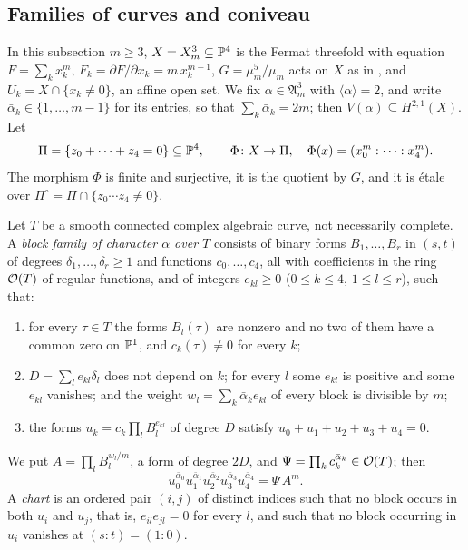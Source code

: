 \subsection{Families of curves and coniveau}\label{ssec:families}
In this subsection $m\ge3$, $X=X^{3}_{m}\subseteq\mathbb{P}^{4}$ is the Fermat
threefold with equation $F=\sum_{k}x_{k}^{m}$, $F_{k}=\partial F/\partial
x_{k}=m\,x_{k}^{m-1}$, $G=\mu_{m}^{5}/\mu_{m}$ acts on $X$ as in
, and $U_{k}=X\cap\{x_{k}\ne0\}$, an affine open set.
We fix $\alpha\in\mathfrak A^{3}_{m}$ with $\langle\alpha\rangle=2$, and
write $\bar\alpha_{k}\in\{1,\dots,m-1\}$ for its entries, so that
$\sum_{k}\bar\alpha_{k}=2m$; then $V(\alpha)\subseteq H^{2,1}(X)$. Let
\[
  \Pi=\{z_{0}+\dots+z_{4}=0\}\subseteq\mathbb{P}^{4},\qquad \Phi\colon X\to\Pi,\quad
  \Phi(x)=(x_{0}^{m}:\dots:x_{4}^{m}).
\]
The morphism $\Phi$ is finite and surjective, it is the quotient by $G$, and
it is \'etale over $\Pi^{\circ}=\Pi\cap\{z_{0}\cdots z_{4}\ne0\}$.

\begin{definition}\label{def:blockfamily}
Let $T$ be a smooth connected complex algebraic curve, not necessarily
complete. A \emph{block family of character $\alpha$ over $T$} consists of
binary forms $B_{1},\dots,B_{r}$ in $(s,t)$ of degrees $\delta_{1},\dots,
\delta_{r}\ge1$ and functions $c_{0},\dots,c_{4}$, all with coefficients in
the ring $\mathcal{O}(T)$ of regular functions, and of integers $e_{kl}\ge0$
($0\le k\le4$, $1\le l\le r$), such that:
\begin{enumerate}[label=\textup{(B\arabic*)}]
\item for every $\tau\in T$ the forms $B_{l}(\tau)$ are nonzero and no two
of them have a common zero on $\mathbb{P}^{1}$, and $c_{k}(\tau)\ne0$ for every
$k$;
\item $D=\sum_{l}e_{kl}\delta_{l}$ does not depend on $k$; for every $l$
some $e_{kl}$ is positive and some $e_{kl}$ vanishes; and the weight
$w_{l}=\sum_{k}\bar\alpha_{k}e_{kl}$ of every block is divisible by $m$;
\item the forms $u_{k}=c_{k}\prod_{l}B_{l}^{e_{kl}}$ of degree $D$ satisfy
$u_{0}+u_{1}+u_{2}+u_{3}+u_{4}=0$.
\end{enumerate}
We put $A=\prod_{l}B_{l}^{w_{l}/m}$, a form of degree $2D$, and
$\Psi=\prod_{k}c_{k}^{\bar\alpha_{k}}\in\mathcal{O}(T)$; then
\begin{equation}\label{eq:uApsi}
  u_{0}^{\bar\alpha_{0}}u_{1}^{\bar\alpha_{1}}u_{2}^{\bar\alpha_{2}}
  u_{3}^{\bar\alpha_{3}}u_{4}^{\bar\alpha_{4}}=\Psi\,A^{m}.
\end{equation}
A \emph{chart} is an ordered pair $(i,j)$ of distinct indices such that no
block occurs in both $u_{i}$ and $u_{j}$, that is, $e_{il}e_{jl}=0$ for
every $l$, and such that no block occurring in $u_{i}$ vanishes at
$(s:t)=(1:0)$.
\end{definition}

